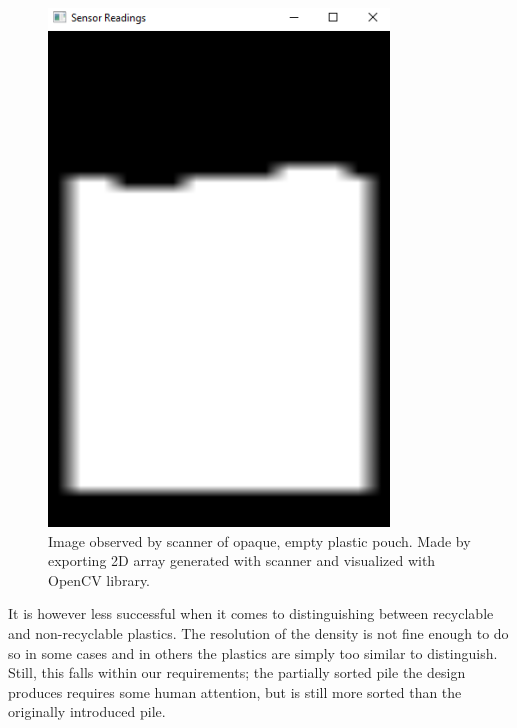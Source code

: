 \documentclass[12pt]{article}
\begin{document}
\begin{multicols*}{2}
            \begin{figure}[H]
                \centering\includegraphics[width=0.5\linewidth]{ScannedImage.png}
                \captionsetup{width=\linewidth}
                \caption{Image observed by scanner of opaque, empty plastic pouch. Made by exporting 2D array generated with scanner and visualized with OpenCV library.}
                \label{fig:ScannedImage}
            \end{figure}

            It is however less successful when it comes to distinguishing between recyclable and non-recyclable plastics. The resolution of the density is not fine enough to do so in some cases and in others the plastics are simply too similar to distinguish. Still, this falls within our requirements; the partially sorted pile the design produces requires some human attention, but is still more sorted than the originally introduced pile. 


\end{multicols*}
\end{document}
